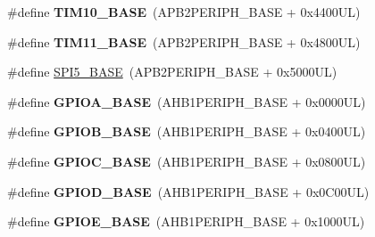 \begin{DoxyCompactItemize}
\item 
\mbox{\label{group___peripheral__memory__map_ga3eff32f3801db31fb4b61d5618cad54a}} 
\#define {\bfseries T\+I\+M10\+\_\+\+B\+A\+SE}~(A\+P\+B2\+P\+E\+R\+I\+P\+H\+\_\+\+B\+A\+SE + 0x4400\+U\+L)
\item 
\mbox{\label{group___peripheral__memory__map_ga3a4a06bb84c703084f0509e105ffaf1d}} 
\#define {\bfseries T\+I\+M11\+\_\+\+B\+A\+SE}~(A\+P\+B2\+P\+E\+R\+I\+P\+H\+\_\+\+B\+A\+SE + 0x4800\+U\+L)
\item 
\#define \hyperlink{group___peripheral__memory__map_gac1c58d33414e167d478ecd0e31331dfa}{S\+P\+I5\+\_\+\+B\+A\+SE}~(A\+P\+B2\+P\+E\+R\+I\+P\+H\+\_\+\+B\+A\+SE + 0x5000\+U\+L)
\item 
\mbox{\label{group___peripheral__memory__map_gad7723846cc5db8e43a44d78cf21f6efa}} 
\#define {\bfseries G\+P\+I\+O\+A\+\_\+\+B\+A\+SE}~(A\+H\+B1\+P\+E\+R\+I\+P\+H\+\_\+\+B\+A\+SE + 0x0000\+U\+L)
\item 
\mbox{\label{group___peripheral__memory__map_gac944a89eb789000ece920c0f89cb6a68}} 
\#define {\bfseries G\+P\+I\+O\+B\+\_\+\+B\+A\+SE}~(A\+H\+B1\+P\+E\+R\+I\+P\+H\+\_\+\+B\+A\+SE + 0x0400\+U\+L)
\item 
\mbox{\label{group___peripheral__memory__map_ga26f267dc35338eef219544c51f1e6b3f}} 
\#define {\bfseries G\+P\+I\+O\+C\+\_\+\+B\+A\+SE}~(A\+H\+B1\+P\+E\+R\+I\+P\+H\+\_\+\+B\+A\+SE + 0x0800\+U\+L)
\item 
\mbox{\label{group___peripheral__memory__map_ga1a93ab27129f04064089616910c296ec}} 
\#define {\bfseries G\+P\+I\+O\+D\+\_\+\+B\+A\+SE}~(A\+H\+B1\+P\+E\+R\+I\+P\+H\+\_\+\+B\+A\+SE + 0x0\+C00\+U\+L)
\item 
\mbox{\label{group___peripheral__memory__map_gab487b1983d936c4fee3e9e88b95aad9d}} 
\#define {\bfseries G\+P\+I\+O\+E\+\_\+\+B\+A\+SE}~(A\+H\+B1\+P\+E\+R\+I\+P\+H\+\_\+\+B\+A\+SE + 0x1000\+U\+L)
\item 
\mbox{\label{group___peripheral__memory__map_gaee4716389f3a1c727495375b76645608}} 

\end{DoxyCompactItemize}
